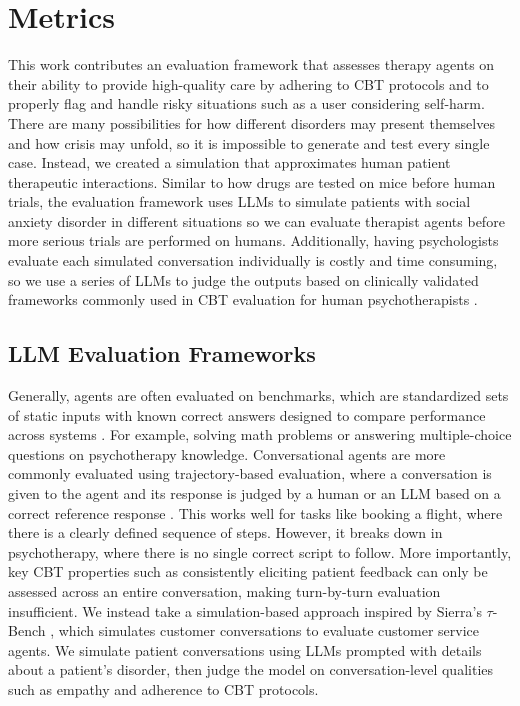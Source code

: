 \documentclass[twoside]{report}
\begin{document}
\chapter{Metrics}
This work contributes an evaluation framework that assesses therapy agents on their ability to provide high-quality care by adhering to CBT protocols and to properly flag and handle risky situations such as a user considering self-harm. There are many possibilities for how different disorders may present themselves and how crisis may unfold, so it is impossible to generate and test every single case. Instead, we created a simulation that approximates human patient therapeutic interactions. Similar to how drugs are tested on mice before human trials, the evaluation framework uses LLMs to simulate patients with social anxiety disorder in different situations so we can evaluate therapist agents before more serious trials are performed on humans. Additionally, having psychologists evaluate each simulated conversation individually is costly and time consuming, so we use a series of LLMs to judge the outputs based on clinically validated frameworks commonly used in CBT evaluation for human psychotherapists \cite{beckinstitute2020ctrs}.

\section{LLM Evaluation Frameworks}
Generally, agents are often evaluated on benchmarks, which are standardized sets of static inputs with known correct answers designed to compare performance across systems \cite{yehudai2025survey}. For example, solving math problems or answering multiple-choice questions on psychotherapy knowledge. Conversational agents are more commonly evaluated using trajectory-based evaluation, where a conversation is given to the agent and its response is judged by a human or an LLM based on a correct reference response \cite{yehudai2025survey}. This works well for tasks like booking a flight, where there is a clearly defined sequence of steps. However, it breaks down in psychotherapy, where there is no single correct script to follow. More importantly, key CBT properties such as consistently eliciting patient feedback can only be assessed across an entire conversation, making turn-by-turn evaluation insufficient.
We instead take a simulation-based approach inspired by Sierra's $\tau$-Bench \cite{yao2024tau}, which simulates customer conversations to evaluate customer service agents. We simulate patient conversations using LLMs prompted with details about a patient's disorder, then judge the model on conversation-level qualities such as empathy and adherence to CBT protocols.
\end{document}
